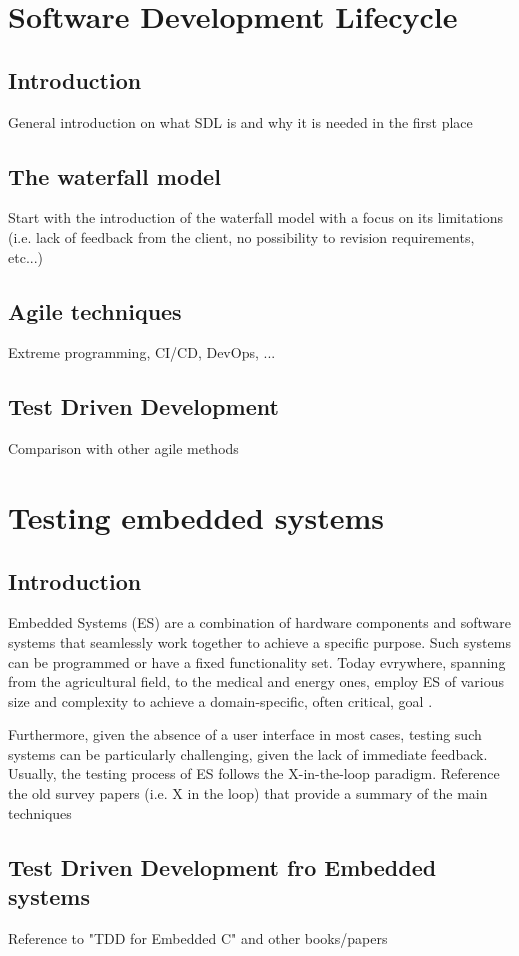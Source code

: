 \newpage
\section{Software Development Lifecycle}
\subsection{Introduction}
General introduction on what SDL is and why it is needed in the first place

\subsection{The waterfall model}
Start with the introduction of the waterfall model with a focus on its limitations (i.e. lack of feedback from the client, no possibility to revision requirements, etc...)


\subsection{Agile techniques}
Extreme programming, CI/CD, DevOps, ...


\subsection{Test Driven Development}
Comparison with other agile methods




\section{Testing embedded systems}
\subsection{Introduction}
Embedded Systems (ES) are a combination of hardware components and software systems that seamlessly work together to achieve a specific purpose. Such systems can be programmed or have a fixed functionality set. 
Today evrywhere, spanning from the agricultural field, to the medical and energy ones, employ ES of various size and complexity to achieve a domain-specific, often critical, goal .


Furthermore, given the absence of a user interface in most cases, testing such systems can be particularly challenging, given the lack of immediate feedback.
Usually, the testing process of ES follows the X-in-the-loop paradigm.
Reference the old survey papers (i.e. X in the loop) that provide a summary of the main techniques


\subsection{Test Driven Development fro Embedded systems}
Reference to "TDD for Embedded C" and other books/papers

